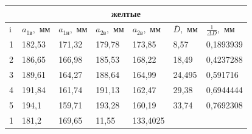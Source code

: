 \documentclass[a4paper,12pt]{article} %
\begin{document}
\begin{table}[]
\begin{tabular}{|lllllll|}
\hline
\multicolumn{7}{|c|}{желтые}                                                                                                                                                                                                                                                                                                 \\ \hline
\multicolumn{1}{|l|}{i} & \multicolumn{1}{l|}{$a_{1 \text{в}}, \text{ мм}$} & \multicolumn{1}{l|}{$a_{1 \text{н}}, \text{ мм}$} & \multicolumn{1}{l|}{$a_{2 \text{в}}, \text{ мм}$} & \multicolumn{1}{l|}{$a_{2 \text{в}}, \text{ мм}$} & \multicolumn{1}{l|}{$\overline{D}, \text{ мм}$} & $\frac{1}{\Delta D}, \text{ мм}$ \\ \hline
\multicolumn{1}{|l|}{1} & \multicolumn{1}{l|}{182,53}                       & \multicolumn{1}{l|}{171,32}                       & \multicolumn{1}{l|}{179,78}                       & \multicolumn{1}{l|}{173,85}                       & \multicolumn{1}{l|}{8,57}                       & 0,1893939                        \\ \hline
\multicolumn{1}{|l|}{2} & \multicolumn{1}{l|}{186,65}                       & \multicolumn{1}{l|}{166,98}                       & \multicolumn{1}{l|}{185,53}                       & \multicolumn{1}{l|}{168,22}                       & \multicolumn{1}{l|}{18,49}                      & 0,4237288                        \\ \hline
\multicolumn{1}{|l|}{3} & \multicolumn{1}{l|}{189,61}                       & \multicolumn{1}{l|}{164,27}                       & \multicolumn{1}{l|}{188,64}                       & \multicolumn{1}{l|}{164,99}                       & \multicolumn{1}{l|}{24,495}                     & 0,591716                         \\ \hline
\multicolumn{1}{|l|}{4} & \multicolumn{1}{l|}{191,84}                       & \multicolumn{1}{l|}{161,74}                       & \multicolumn{1}{l|}{191,13}                       & \multicolumn{1}{l|}{162,47}                       & \multicolumn{1}{l|}{29,38}                      & 0,6944444                        \\ \hline
\multicolumn{1}{|l|}{5} & \multicolumn{1}{l|}{194,1}                        & \multicolumn{1}{l|}{159,71}                       & \multicolumn{1}{l|}{193,28}                       & \multicolumn{1}{l|}{160,19}                       & \multicolumn{1}{l|}{33,74}                      & 0,7692308                        \\ \hline
\multicolumn{1}{|l|}{1} & \multicolumn{1}{l|}{181,2}                        & \multicolumn{1}{l|}{169,65}                       & \multicolumn{1}{l|}{11,55}                        & \multicolumn{1}{l|}{133,4025}                     & \multicolumn{1}{l|}{}                           &                                  \\ \hline
\end{tabular}
\end{table}
\end{document}
